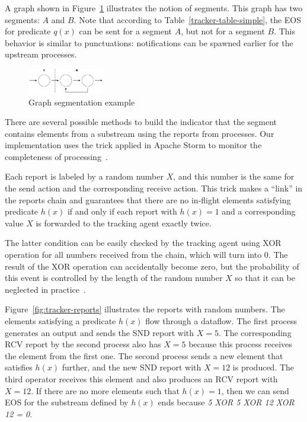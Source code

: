 A graph shown in Figure~\ref{fig:tracker-acker-comparison} illustrates the notion of segments. This graph has two segments: $A$ and $B$. Note that according to Table~\ref{tracker-table-simple}, the EOS for predicate $q(x)$ can be sent for a segment $A$, but not for a segment $B$. This behavior is similar to punctuations: notifications can be spawned earlier for the upstream processes.

\begin{figure}[htbp]
  \centering
  \includegraphics[width=0.3\textwidth]{pics/segments-example.pdf}
  \caption{Graph segmentation example}
  \label{fig:tracker-acker-comparison}
\end{figure}

There are several possible methods to build the indicator that the segment contains elements from a substream using the reports from processes. Our implementation uses the trick applied in Apache Storm to monitor the completeness of processing~\cite{apache:storm:acker}. 

Each report is labeled by a random number $X$, and this number is the same for the send action and the corresponding receive action. This trick makes a ``link'' in the reports chain and guarantees that there are no in-flight elements satisfying predicate $h(x)$ if and only if each report with $h(x)=1$ and a corresponding value $X$ is forwarded to the tracking agent exactly twice.

The latter condition can be easily checked by the tracking agent using XOR operation for all numbers received from the chain, which will turn into 0. The result of the XOR operation can accidentally become zero, but the probability of this event is controlled by the length of the random number $X$ so that it can be neglected in practice~\cite{apache:storm:acker}.

Figure~\ref{fig:tracker-reports} illustrates the reports with random numbers. The elements satisfying a predicate $h(x)$ flow through a dataflow. The first process generates an output and sends the SND report with $X=5$. The corresponding RCV report by the second process also has $X=5$ because this process receives the element from the first one. The second process sends a new element that satisfies $h(x)$ further, and the new SND report with $X=12$ is produced. The third operator receives this element and also produces an RCV report with $X=12$. If there are no more elements such that $h(x)=1$, then we can send EOS for the substream defined by $h(x)$ ends because {\em 5 XOR 5 XOR 12 XOR 12 = 0}. 

